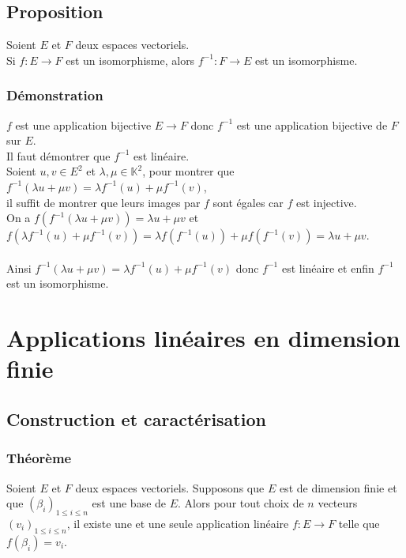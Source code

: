 \documentclass[a4paper,10pt]{book} %
\newcommand{\K}{\mathbb{K}}
\begin{document}
\subsection{Proposition}
Soient $E$ et $F$ deux espaces vectoriels.\\
Si $f:E\rightarrow F$ est un isomorphisme, alors $f^{-1} : F\rightarrow E$ est un isomorphisme.

\subsubsection{Démonstration}
$f$ est une application bijective $E\rightarrow F$ donc $f^{-1}$ est une application bijective de $F$ sur $E$.\\
Il faut démontrer que $f^{-1}$ est linéaire.\\

Soient $u,v \in E^2$ et $\lambda, \mu \in \K^2$, pour montrer que $f^{-1}(\lambda u+\mu v)=\lambda f^{-1}(u)+\mu f^{-1}(v)$,\\
il suffit de montrer que leurs images par $f$ sont égales car $f$ est injective.\\

On a $f(f^{-1}(\lambda u+\mu v))=\lambda u+\mu v$ et
$f(\lambda f^{-1}(u)+\mu f^{-1}(v))=\lambda f(f^{-1}(u))+\mu f(f^{-1}(v))=\lambda u+\mu v$.\\\\
Ainsi $f^{-1}(\lambda u+\mu v)=\lambda f^{-1}(u)+\mu f^{-1}(v)$ donc $f^{-1}$ est linéaire et enfin $f^{-1}$ est un isomorphisme.

\newpage

\section{Applications linéaires en dimension finie}
\subsection{Construction et caractérisation}
\subsubsection{Théorème}
Soient $E$ et $F$ deux espaces vectoriels. Supposons que $E$ est de dimension finie et que $(\beta_i)_{1\leq i\leq n}$ est une base de $E$. Alors pour tout choix de $n$ vecteurs $(v_i)_{1\leq i\leq n}$, il existe une et une seule application linéaire $f:E\rightarrow F$ telle que $f(\beta_i)=v_i$.
\end{document}

